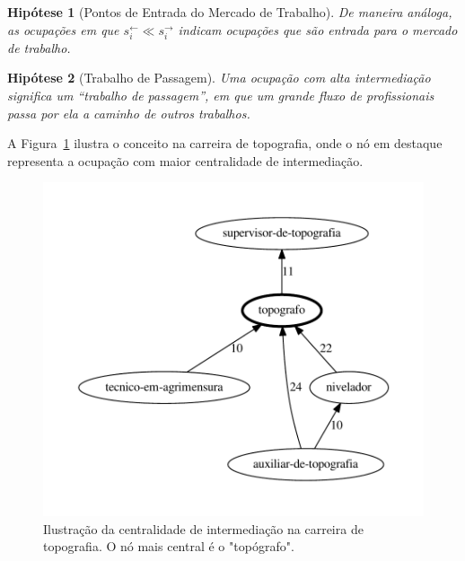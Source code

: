 \documentclass[12pt,a4paper]{article}
\theoremstyle{hypo}
\newtheorem{hypothesis}{Hipótese}
\newcommand{\linkin}[1]{#1^\leftarrow} %
\newcommand{\linkout}[1]{#1^\rightarrow} %
\begin{document}
\begin{hypothesis}[Pontos de Entrada do Mercado de Trabalho]
    De maneira análoga, as ocupações em que $\linkin{s}_i \ll \linkout{s}_i$ indicam ocupações que são entrada para o mercado de trabalho.
\end{hypothesis}

\begin{hypothesis}[Trabalho de Passagem]
    Uma ocupação com alta intermediação significa um \enquote{trabalho de passagem}, em que um grande fluxo de profissionais passa por ela a caminho de outros trabalhos.
\end{hypothesis}


A Figura~\ref{fig:carreira-topografia} ilustra o conceito na carreira de topografia, onde o nó em destaque representa a ocupação com maior centralidade de intermediação.

\begin{figure}[ht]
  \centering
  \includegraphics[scale=0.6]{cluster_25.pdf}
  \caption{Ilustração da centralidade de intermediação na carreira de topografia. O nó mais central é o "topógrafo".}
  \label{fig:carreira-topografia}
\end{figure}
\end{document}
